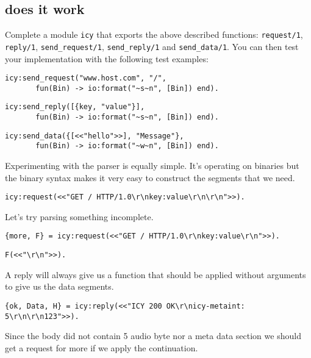 \documentclass[a4paper,11pt]{article}
\begin{document}
\subsection{does it work}

Complete a module {\tt icy} that exports the above described
functions: {\tt request/1}, {\tt reply/1}, {\tt send\_request/1},
{\tt send\_reply/1} and {\tt send\_data/1}. You can then test your
implementation with the following test examples:

\begin{verbatim}
icy:send_request("www.host.com", "/", 
       fun(Bin) -> io:format("~s~n", [Bin]) end).
\end{verbatim}

\begin{verbatim}
icy:send_reply([{key, "value"}], 
       fun(Bin) -> io:format("~s~n", [Bin]) end).
\end{verbatim}

\begin{verbatim}
icy:send_data({[<<"hello">>], "Message"}, 
       fun(Bin) -> io:format("~w~n", [Bin]) end).
\end{verbatim}

Experimenting with the parser is equally simple. It's operating on
binaries but the binary syntax makes it very easy to construct the
segments that we need.

\begin{verbatim}
icy:request(<<"GET / HTTP/1.0\r\nkey:value\r\n\r\n">>).
\end{verbatim}

Let's try parsing something incomplete.

\begin{verbatim}
{more, F} = icy:request(<<"GET / HTTP/1.0\r\nkey:value\r\n">>).
\end{verbatim}

\begin{verbatim}
F(<<"\r\n">>).
\end{verbatim}

A reply will always give us a function that should be applied
without arguments to give us the data segments.

\begin{verbatim}
{ok, Data, H} = icy:reply(<<"ICY 200 OK\r\nicy-metaint: 5\r\n\r\n123">>).
\end{verbatim}

Since the body did not contain 5 audio byte nor a meta data section we
should get a request for more if we apply the continuation.
\end{document}
